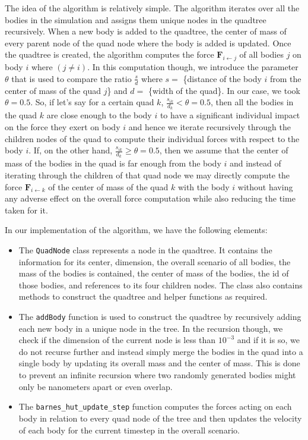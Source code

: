 \documentclass[12pt]{article}
\begin{document}
The idea of the algorithm is relatively simple. The algorithm iterates over all the bodies in the simulation and assigns them unique nodes in the quadtree recursively. When a new body is added to the quadtree, the center of mass of every parent node of the quad node where the body is added is updated. Once the quadtree is created, the algorithm computes the force $\boldsymbol{F}_{i \gets j}$ of all bodies $j$ on body $i$ where $(j \neq i)$. In this computation though, we introduce the parameter $\theta$ that is used to compare the ratio $\frac{s}{d}$ where $s=$ \{distance of the body $i$ from the center of mass of the quad $j$\} and $d=$ \{width of the quad\}. In our case, we took $\theta=0.5$. So, if let's say for a certain quad $k$, $\frac{s_{ik}}{d_k} < \theta=0.5$, then all the bodies in the quad $k$ are close enough to the body $i$ to have a significant individual impact on the force they exert on body $i$ and hence we iterate recursively through the children nodes of the quad to compute their individual forces with respect to the body $i$. If, on the other hand, $\frac{s_{ik}}{d_k} \geq \theta=0.5$, then we assume that the center of mass of the bodies in the quad is far enough from the body $i$ and instead of iterating through the children of that quad node we may directly compute the force $\boldsymbol{F}_{i \gets k}$ of the center of mass of the quad $k$ with the body $i$ without having any adverse effect on the overall force computation while also reducing the time taken for it.

In our implementation of the algorithm, we have the following elements:
\begin{itemize}
    \item The \verb|QuadNode| class represents a node in the quadtree. It contains the information for its center, dimension, the overall scenario of all bodies, the mass of the bodies is contained, the center of mass of the bodies, the id of those bodies, and references to its four children nodes. The class also contains methods to construct the quadtree and helper functions as required.
    \item The \verb|addBody| function is used to construct the quadtree by recursively adding each new body in a unique node in the tree. In the recursion though, we check if the dimension of the current node is less than $10^{-3}$ and if it is so, we do not recurse further and instead simply merge the bodies in the quad into a single body by updating its overall mass and the center of mass. This is done to prevent an infinite recursion where two randomly generated bodies might only be nanometers apart or even overlap.
    \item The \verb|barnes_hut_update_step| function computes the forces acting on each body in relation to every quad node of the tree and then updates the velocity of each body for the current timestep in the overall scenario.
\end{itemize}
\end{document}
